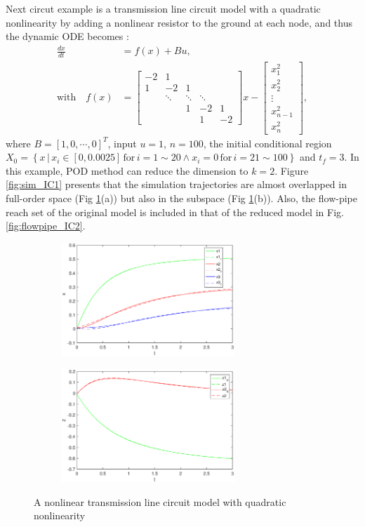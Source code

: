 \documentclass[runningheads,a4paper]{llncs}
\theoremstyle{definition}
\theoremstyle{plain}
\begin{document}
Next circut example is a transmission line circuit model with a quadratic nonlinearity by adding a nonlinear resistor to the ground at each node, and thus the dynamic ODE becomes \cite{REWIENSKI2006426}: 
\begin{align}
\frac{dx}{dt}&=f(x)+Bu,\\
\mbox{with}\quad f(x)&=
\begin{bmatrix}
    -2 & 1 &   &   &  \\
    1  & -2 & 1 &   &  \\
        & \ddots & \ddots & \ddots &  \\
        &    & 1 & -2  & 1\\
        &    &   & 1 & -2
\end{bmatrix} x -
\begin{bmatrix}
    x_1^2  \\
    x_2^2  \\
        \vdots \\
    x_{n-1}^2\\
    x_{n}^2
\end{bmatrix},
\end{align}
where $B=[1,0,\cdots,0]^T$,  input $u=1$, $n=100$, the initial conditional region $X_0=\left\{x \, |\, x_i \in [0,0.0025]  \, \mbox{for}\, i=1\sim20 \wedge x_i=0 \,  \mbox{for}\, i=21\sim100 \right\}$ and $t_f=3$.  In this example, POD method can reduce the dimension to $k=2$.  Figure \ref{fig:sim_IC1} presents that the simulation trajectories are almost overlapped in full-order space (Fig \ref{fig:sim_IC2}(a)) but also in the subspace (Fig \ref{fig:sim_IC2}(b)). Also, the flow-pipe reach set of the original model is included in that of the reduced model in Fig.\ref{fig:flowpipe_IC2}.
\begin{figure}[h]
\begin{subfigure}{.5\textwidth}
  \centering
   \includegraphics[width=6.5cm]{IC2x_k2comapre.eps}
   \parbox{4cm}{\subcaption{}}
\end{subfigure}%
\begin{subfigure}{.5\textwidth}
  \centering
  \includegraphics[width=6.5cm]{IC2z_k2comapre.eps}
  \parbox{4cm}{\subcaption{}}
\end{subfigure}
\caption{A nonlinear transmission line circuit model with quadratic nonlinearity}
\label{fig:sim_IC2}
\end{figure}
\end{document}
